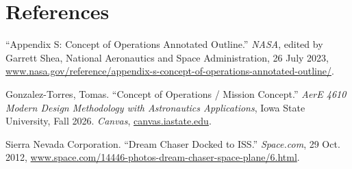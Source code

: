 \documentclass{article}
\newcommand{\hangingcite}{\noindent\hangindent=0.5in\hangafter=1}
\begin{document}
\newpage
\section{References}
\vspace{0.5cm}
\hangingcite ``Appendix S: Concept of Operations Annotated Outline.'' \textit{NASA}, edited by Garrett Shea, National Aeronautics and Space Administration, 26 July 2023, \url{www.nasa.gov/reference/appendix-s-concept-of-operations-annotated-outline/}.

\vspace{0.5cm}
\hangingcite Gonzalez-Torres, Tomas. ``Concept of Operations / Mission Concept.'' \textit{AerE 4610 Modern Design Methodology with Astronautics Applications}, Iowa State University, Fall 2026. \textit{Canvas}, \url{canvas.iastate.edu}.

\vspace{0.5cm}
\hangingcite Sierra Nevada Corporation. ``Dream Chaser Docked to ISS.'' \textit{Space.com}, 29 Oct. 2012, \url{www.space.com/14446-photos-dream-chaser-space-plane/6.html}.
\end{document}
